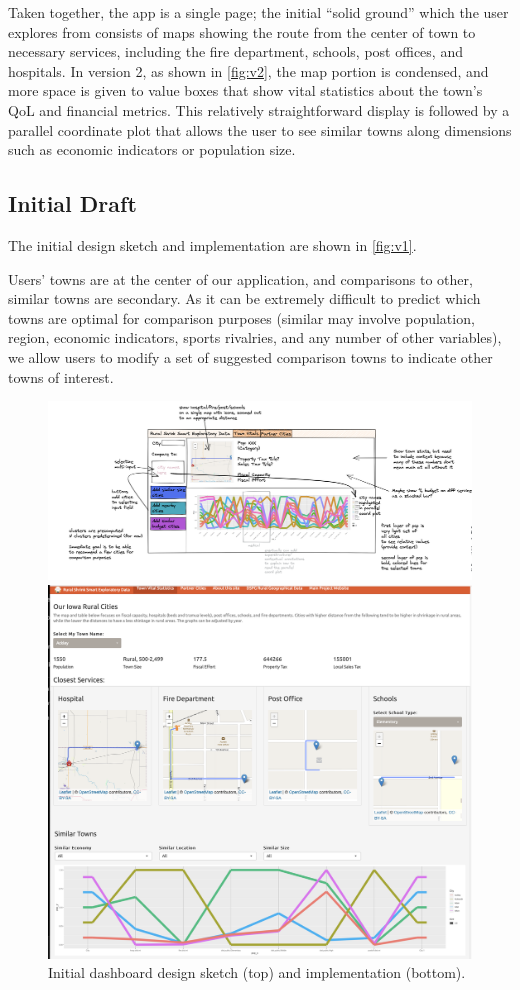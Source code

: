 \documentclass[print]{nuthesis}
\begin{document}
Taken together, the app is a single page; the initial ``solid ground'' which the user explores from consists of maps showing the route from the center of town to necessary services, including the fire department, schools, post offices, and hospitals. In version 2, as shown in \autoref{fig:v2}, the map portion is condensed, and more space is given to value boxes that show vital statistics about the town's QoL and financial metrics. This relatively straightforward display is followed by a parallel coordinate plot that allows the user to see similar towns along dimensions such as economic indicators or population size.

\hypertarget{initial-draft}{%
\subsection{Initial Draft}\label{initial-draft}}

The initial design sketch and implementation are shown in \autoref{fig:v1}.

Users' towns are at the center of our application, and comparisons to other, similar towns are secondary. As it can be extremely difficult to predict which towns are optimal for comparison purposes (similar may involve population, region, economic indicators, sports rivalries, and any number of other variables), we allow users to modify a set of suggested comparison towns to indicate other towns of interest.

\begin{figure}
\centering
\includegraphics[width=\textwidth]{figure/Version1.png}

\includegraphics[width=.7\textwidth]{figure/Version2.png}
\caption{Initial dashboard design sketch (top) and implementation (bottom).}\label{fig:v1}
\end{figure}
\end{document}
